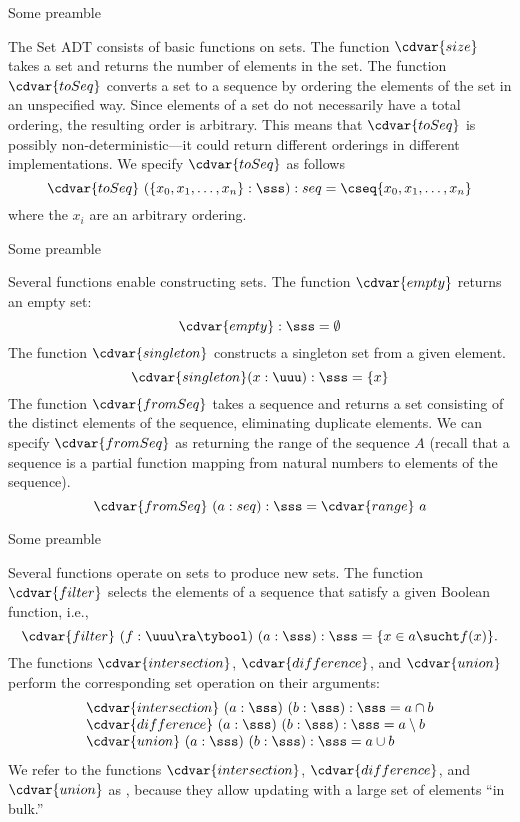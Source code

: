 Some preamble \somecommand
\begin{gram}
The Set ADT consists of basic functions on sets.  
%
The function $\cdvar{size}$ takes a set and returns the number of elements
in the set.
% 
The function $\cdvar{toSeq}$ converts a set to a sequence by ordering the
elements of the set in an unspecified way. 
%
Since elements of a set do not necessarily have a total ordering, the
resulting order is arbitrary.
%
This means that $\cdvar{toSeq}$ is possibly non-deterministic---it could
return different orderings in different implementations.
%
We specify $\cdvar{toSeq}$ as follows
\[
\cdvar{toSeq}~(\{x_0,x_1,\ldots,x_n\} : \sss): seq = \cseq{x_0,x_1,\ldots,x_n}
\]
where the $x_i$ are an arbitrary ordering. 
\end{gram}


Some preamble \somecommand
\begin{gram}
Several functions enable constructing sets.
%
The function $\cdvar{empty}$ returns an empty set:
%
\[
\cdvar{empty} : \sss = \emptyset
\]
%
The function $\cdvar{singleton}$ constructs a singleton set from a given
element.
%
\[
\cdvar{singleton} (x : \uuu) : \sss = \{x \}
\]
%
The function $\cdvar{fromSeq}$ takes a sequence and returns a set consisting of the
distinct elements of the sequence, eliminating duplicate elements.
%
We can specify $\cdvar{fromSeq}$ as returning the range of the sequence
$A$ (recall that a sequence is a partial function mapping from natural numbers
to elements of the sequence).
%
\[
\cdvar{fromSeq}~(a : seq) : \sss = \cdvar{range}~a
\]
%
\end{gram}

Some preamble \somecommand
\begin{gram}
%
Several functions operate on sets to produce new sets.
%
The function $\cdvar{filter}$ selects the elements of a sequence that
satisfy a given Boolean function, i.e., 
%
\[
\cdvar{filter}~(f : \uuu \ra \tybool)~(a : \sss) : \sss = \{ x \in a \sucht f(x)\} .
\]
%
The functions $\cdvar{intersection}$, $\cdvar{difference}$, and $\cdvar{union}$
perform the corresponding set operation on their arguments:
%
\[
\begin{array}{l}
\cdvar{intersection}~(a : \sss)~(b : \sss) : \sss = a \cap b\\
\cdvar{difference}~(a  : \sss)~(b : \sss) : \sss = a \setminus b\\
\cdvar{union}~(a : \sss)~(b : \sss) : \sss = a \cup b
\end{array}
\]
%
We refer to the functions  $\cdvar{intersection}$, $\cdvar{difference}$, and $\cdvar{union}$
as , because they allow updating with a large set
of elements ``in bulk.''
\end{gram}

